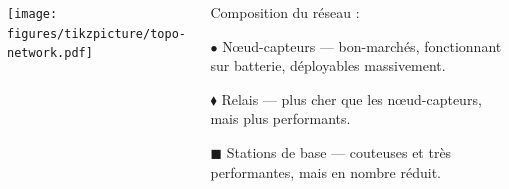 \documentclass[../main.tex]{subfiles}
\begin{document}
\begin{frame}{}

  \begin{columns}
    \begin{column}{.5\linewidth}
      \texttt{[image: figures/tikzpicture/topo-network.pdf]}
    \end{column}
    \begin{column}{.5\linewidth}
      Composition du réseau :

      \begin{ctrlitemize}{2pt}
        \item [\textcolor{RoyalBlue3}{$\bullet$}] \textcolor{RoyalBlue3}{Nœud-capteurs   }
        --- bon-marchés, fonctionnant sur batterie, déployables massivement.
        \item [\textcolor{Chartreuse3}{$\blacklozenge$}] \textcolor{Chartreuse3}{Relais  }
        --- plus cher que les nœud-capteurs, mais plus performants.
        \item [\textcolor{Gold3}{$\blacksquare$}] \textcolor{Gold3}{Stations de base     }
        --- couteuses et très performantes, mais en nombre réduit.
      \end{ctrlitemize}
    \end{column}
  \end{columns}
\end{frame}
\end{document}
